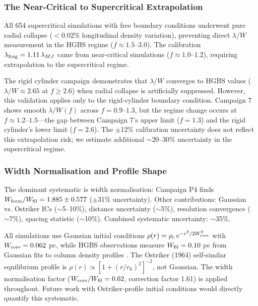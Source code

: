 \documentclass[twocolumn]{mnras}
\begin{document}
\subsubsection{The Near-Critical to Supercritical Extrapolation}
\label{sec:extrapolation_problem}

All 654 supercritical simulations with free boundary conditions underwent pure radial collapse ($<0.02\%$ longitudinal density variation), preventing direct $\lambda/W$ measurement in the HGBS regime ($f \approx 1.5$--$3.0$). The calibration $\lambda_{\rm frag} = 1.11\,\lambda_{MJ}$ came from near-critical simulations ($f \approx 1.0$--$1.2$), requiring extrapolation to the supercritical regime.

The rigid cylinder campaign demonstrates that $\lambda/W$ converges to HGBS values ($\lambda/W \approx 2.65$ at $f \geq 2.6$) when radial collapse is artificially suppressed. However, this validation applies only to the rigid-cylinder boundary condition. Campaign 7 shows smooth $\lambda/W(f)$ across $f = 0.9$--$1.3$, but the regime change occurs at $f \approx 1.2$--$1.5$---the gap between Campaign 7's upper limit ($f = 1.3$) and the rigid cylinder's lower limit ($f = 2.6$). The $\pm$12\% calibration uncertainty does not reflect this extrapolation risk; we estimate additional $\sim$20--30\% uncertainty in the supercritical regime.

\subsubsection{Width Normalisation and Profile Shape}

The dominant systematic is width normalisation: Campaign P4 finds $W_{\rm form}/W_{\rm fil} = 1.885 \pm 0.577$ ($\pm$31\% uncertainty). Other contributions: Gaussian vs. Ostriker ICs ($\sim$5--10\%), distance uncertainty ($\sim$5\%), resolution convergence ($\sim$7\%), spacing statistic ($\sim$10\%). Combined systematic uncertainty: $\sim$35\%.

All simulations use Gaussian initial conditions $\rho(r) = \rho_c\,e^{-r^2/2W_{\rm core}^2}$ with $W_{\rm core} = 0.062$ pc, while HGBS observations measure $W_{\rm fil} = 0.10$ pc from Gaussian fits to column density profiles \citep{Arzoumanian2011}. The Ostriker (1964) self-similar equilibrium profile is $\rho(r) \propto [1 + (r/r_0)^2]^{-2}$, not Gaussian. The width normalisation factor ($W_{\rm core}/W_{\rm fil} = 0.62$, correction factor 1.61) is applied throughout. Future work with Ostriker-profile initial conditions would directly quantify this systematic.
\end{document}
